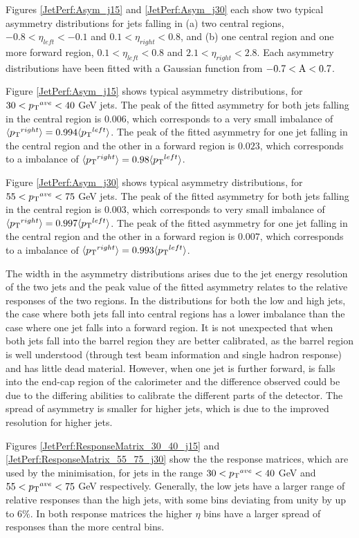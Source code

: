 Figures \ref{JetPerf:Asym_j15} and \ref{JetPerf:Asym_j30} each show two typical asymmetry distributions for jets falling in (a) two central regions, $-0.8<\eta_{left}<-0.1$ and $0.1<\eta_{right}<0.8$, and (b) one central region and one more forward region, $0.1<\eta_{left}<0.8$ and $2.1<\eta_{right}<2.8$. 
Each asymmetry distributions have been fitted with a Gaussian function from $\rm{-0.7<A<0.7}$.

Figure \ref{JetPerf:Asym_j15} shows typical asymmetry distributions, for $30<\mbox{$\mbox{$p_{\rm T}$}{}^{ave}$}{}<40$ GeV jets.
The peak of the fitted asymmetry for both jets falling in the central region is $0.006$, which corresponds to a very small \pt{} imbalance of $\mbox{$\langle \mbox{$p_{\rm T}$}{}^{right} \rangle$}= 0.994 \mbox{$\langle \mbox{$p_{\rm T}$}{}^{left} \rangle$}$.
The peak of the fitted asymmetry for one jet falling in the central region and the other in a forward region is $0.023$, which corresponds to a \pt{} imbalance of $\mbox{$\langle \mbox{$p_{\rm T}$}{}^{right} \rangle$}= 0.98 \mbox{$\langle \mbox{$p_{\rm T}$}{}^{left} \rangle$}$.

Figure \ref{JetPerf:Asym_j30} shows typical asymmetry distributions, for $55<\mbox{$\mbox{$p_{\rm T}$}{}^{ave}$}{}<75$ GeV jets.
The peak of the fitted asymmetry for both jets falling in the central region is $0.003$, which corresponds to very small \pt{} imbalance of $\mbox{$\langle \mbox{$p_{\rm T}$}{}^{right} \rangle$}= 0.997 \mbox{$\langle \mbox{$p_{\rm T}$}{}^{left} \rangle$}$. 
The peak of the fitted asymmetry for one jet falling in the central region and the other in a forward region is $0.007$, which corresponds to a \pt{} imbalance of $\mbox{$\langle \mbox{$p_{\rm T}$}{}^{right} \rangle$}= 0.993 \mbox{$\langle \mbox{$p_{\rm T}$}{}^{left} \rangle$}$.

The width in the asymmetry distributions arises due to the jet energy resolution of the two jets and the peak value of the fitted asymmetry relates to the relative responses of the two regions.
In the distributions for both the low and high \ptave{} jets, the case where both jets fall into central regions has a lower \pt{} imbalance than the case where one jet falls into a forward region.  
It is not unexpected that when both jets fall into the barrel region they are better calibrated, as the barrel region is well understood (through test beam information and single hadron response) and has little dead material.
However, when one jet is further forward, is falls into the end-cap region of the calorimeter and the difference observed could be due to the differing abilities to calibrate the different parts of the detector. 
The spread of asymmetry is smaller for higher \ptave{} jets, which is due to the improved resolution for higher \pt{} jets.


Figures \ref{JetPerf:ResponseMatrix_30_40_j15} and \ref{JetPerf:ResponseMatrix_55_75_j30} show the the response matrices, which are used by the minimisation, for jets in the range $30<\mbox{$\mbox{$p_{\rm T}$}{}^{ave}$}{}<40$ GeV and $55<\mbox{$\mbox{$p_{\rm T}$}{}^{ave}$}{}<75$ GeV respectively.
Generally, the low \ptave{} jets have a larger range of relative responses than the high \ptave{} jets, with some bins deviating from unity by up to $6\%$.
In both response matrices the higher $\eta$ bins have a larger spread of responses than the more central bins.


